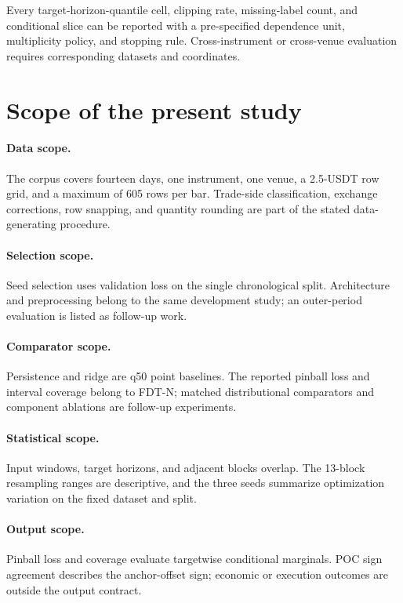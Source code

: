 \documentclass[10pt]{article}
\begin{document}
Every target-horizon-quantile cell, clipping rate, missing-label count, and conditional slice can be
reported with a pre-specified dependence unit, multiplicity policy, and stopping rule. Cross-instrument
or cross-venue evaluation requires corresponding datasets and coordinates.

\section{Scope of the present study}
\label{sec:scope}

\paragraph{Data scope.}
The corpus covers fourteen days, one instrument, one venue, a 2.5-USDT row grid, and a maximum of 605
rows per bar. Trade-side classification, exchange corrections, row snapping, and quantity rounding
are part of the stated data-generating procedure.

\paragraph{Selection scope.}
Seed selection uses validation loss on the single chronological split. Architecture and preprocessing
belong to the same development study; an outer-period evaluation is listed as follow-up work.

\paragraph{Comparator scope.}
Persistence and ridge are q50 point baselines. The reported pinball loss and interval coverage belong
to FDT-N; matched distributional comparators and component ablations are follow-up experiments.

\paragraph{Statistical scope.}
Input windows, target horizons, and adjacent blocks overlap. The 13-block resampling ranges are
descriptive, and the three seeds summarize optimization variation on the fixed dataset and split.

\paragraph{Output scope.}
Pinball loss and coverage evaluate targetwise conditional marginals. POC sign agreement describes the
anchor-offset sign; economic or execution outcomes are outside the output contract.
\end{document}
